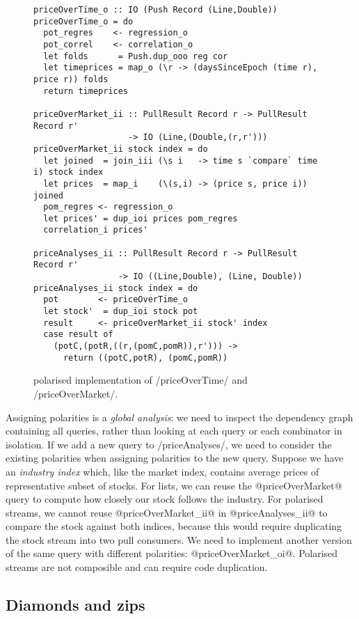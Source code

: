 \begin{figure}
\begin{lstlisting}
priceOverTime_o :: IO (Push Record (Line,Double))
priceOverTime_o = do
  pot_regres    <- regression_o
  pot_correl    <- correlation_o
  let folds      = Push.dup_ooo reg cor
  let timeprices = map_o (\r -> (daysSinceEpoch (time r), price r)) folds
  return timeprices

priceOverMarket_ii :: PullResult Record r -> PullResult Record r'
                   -> IO (Line,(Double,(r,r')))
priceOverMarket_ii stock index = do
  let joined  = join_iii (\s i   -> time s `compare` time i) stock index
  let prices  = map_i    (\(s,i) -> (price s, price i))      joined
  pom_regres <- regression_o
  let prices' = dup_ioi prices pom_regres
  correlation_i prices'

priceAnalyses_ii :: PullResult Record r -> PullResult Record r'
                 -> IO ((Line,Double), (Line, Double))
priceAnalyses_ii stock index = do
  pot        <- priceOverTime_o
  let stock'  = dup_ioi stock pot
  result     <- priceOverMarket_ii stock' index
  case result of 
    (potC,(potR,((r,(pomC,pomR)),r'))) ->
      return ((potC,potR), (pomC,pomR))
\end{lstlisting}
\caption[Polarised implementation of priceOverTime and priceOverMarket]{polarised implementation of \Hs/priceOverTime/ and \Hs/priceOverMarket/.}
\label{figs/impl/polar/priceOverTime-priceOverMarket}
\end{figure}

Assigning polarities is a \emph{global analysis}: we need to inspect the dependency graph containing all queries, rather than looking at each query or each combinator in isolation.
If we add a new query to \Hs/priceAnalyses/, we need to consider the existing polarities when assigning polarities to the new query.
Suppose we have an \emph{industry index} which, like the market index, contains average prices of representative subset of stocks.
For lists, we can reuse the @priceOverMarket@ query to compute how closely our stock follows the industry.
For polarised streams, we cannot reuse @priceOverMarket_ii@ in @priceAnalyses_ii@ to compare the stock against both indices, because this would require duplicating the stock stream into two pull consumers.
We need to implement another version of the same query with different polarities: @priceOverMarket_oi@.
Polarised streams are not composible and can require code duplication.

\subsection{Diamonds and zips}

